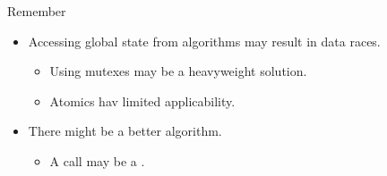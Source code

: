 \begin{frame}[t]{Remember}
\begin{itemize}
  \item Accessing global state from algorithms may result
        in data races.
    \begin{itemize}
      \item Using mutexes may be a heavyweight solution.
      \item Atomics hav limited applicability.
    \end{itemize}

  \vspace{1em}\pause
  \item There might be a better algorithm.
    \begin{itemize}
      \item A  call may be
            a .
    \end{itemize}
\end{itemize}
\end{frame}

